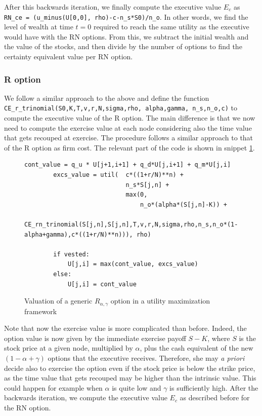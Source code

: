 After this backwards iteration, we finally compute the executive value $E_c$ as \\
\verb|RN_ce = (u_minus(U[0,0], rho)-c-n_s*S0)/n_o|.
In other words, we find the level of wealth at time $t=0$ required to reach the same utility as the executive would have with the RN options. From this, we subtract the initial wealth and the value of the stocks, and then divide by the number of options to find the certainty equivalent value per RN option.

\subsubsection{R option}
We follow a similar approach to the above and define the function\\
\verb|CE_r_trinomial(S0,K,T,v,r,N,sigma,rho, alpha,gamma, n_s,n_o,c)| to compute the executive value of the R option. The main difference is that we now need to compute the exercise value at each node considering also the time value that gets recouped at exercise. The procedure follows a similar approach to that of the R option as firm cost. The relevant part of the code is shown in snippet \ref*{fig:ce_exec_r}.

\vspace*{15pt}
\begin{figure}[H]
    \begin{lstlisting}[breaklines, basicstyle=\ttfamily\small]
        cont_value = q_u * U[j+1,i+1] + q_d*U[j,i+1] + q_m*U[j,i]
        excs_value = util(  c*((1+r/N)**n) +              
                            n_s*S[j,n] + 
                            max(0, 
                                n_o*(alpha*(S[j,n]-K)) + 
                                CE_rn_trinomial(S[j,n],S[j,n],T,v,r,N,sigma,rho,n_s,n_o*(1-alpha+gamma),c*((1+r/N)**n))), rho)

        if vested:
            U[j,i] = max(cont_value, excs_value)
        else: 
            U[j,i] = cont_value
    \end{lstlisting}
    \caption{Valuation of a generic $R_{\alpha, \gamma}$ option in a utility maximization framework}
    \label{fig:ce_exec_r}
\end{figure}
\vspace*{15pt}


Note that now the exercise value is more complicated than before. Indeed, the option value is now given by the immediate exercise payoff $S-K$, where $S$ is the stock price at a given node, multiplied by $\alpha$, plus the cash equivalent of the new $(1-\alpha+\gamma)$ options that the executive receives. Therefore, she may \textit{a priori} decide also to exercise the option even if the stock price is below the strike price, as the time value that gets recouped may be higher than the intrinsic value. This could happen for example when $\alpha$ is quite low and $\gamma$ is sufficiently high. 
After the backwards iteration, we compute the executive value $E_c$ as described before for the RN option.

